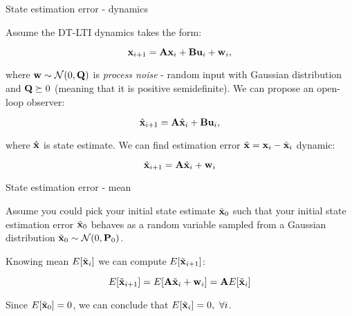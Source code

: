 \documentclass{beamer}
\begin{document}
\begin{frame}{State estimation error - dynamics}
	\begin{flushleft}
		
		Assume the DT-LTI dynamics takes the form:
		
		\begin{equation}
			\mathbf{x}_{i+1} = \mathbf{A} \mathbf{x}_i + \mathbf{B} \mathbf{u}_i + \mathbf{w}_i,
		\end{equation}
		
		where $\mathbf{w} \sim \mathcal{N} (0, \mathbf{Q})$ is \emph{process noise} - random input with Gaussian distribution and $\mathbf{Q} \succeq 0$ (meaning that it is positive semidefinite). We can propose an open-loop observer:
		
		\begin{equation}
			\hat{\mathbf{x}}_{i+1} = \mathbf{A} \hat{\mathbf{x}}_i + \mathbf{B} \mathbf{u}_i, 
		\end{equation}
		
		where $\hat{\mathbf{x}}$ is state estimate. We can find estimation error $\Tilde{\mathbf{x}} = \mathbf{x}_i - \hat{\mathbf{x}}_i$ dynamic:
		
		\begin{equation}
			\Tilde{\mathbf{x}}_{i+1} = \mathbf{A} \Tilde{\mathbf{x}}_i + \mathbf{w}_i
		\end{equation}
		
	\end{flushleft}
\end{frame}



\begin{frame}{State estimation error - mean}
	\begin{flushleft}
		
		Assume you could pick your initial state estimate $\hat{\mathbf{x}}_0$ such that your initial state estimation error $\Tilde{\mathbf{x}}_0$ behaves as a random variable sampled from a  Gaussian distribution $\Tilde{\mathbf{x}}_0 \sim \mathcal{N} (0, \mathbf{P}_0)$.
		
		\bigskip
		
		Knowing mean $E[\Tilde{\mathbf{x}}_i]$ we can compute $E[\Tilde{\mathbf{x}}_{i+1}]$:
		
		\begin{equation}
			E[\Tilde{\mathbf{x}}_{i+1}] = E[\mathbf{A} \Tilde{\mathbf{x}}_i + \mathbf{w}_i] = 
			\mathbf{A} E[\Tilde{\mathbf{x}}_i]
		\end{equation}		
	
		Since $E[\Tilde{\mathbf{x}}_0] = 0$, we can conclude that $E[\Tilde{\mathbf{x}}_i] = 0, \ \forall i$.
		
		
	\end{flushleft}
\end{frame}
\end{document}
